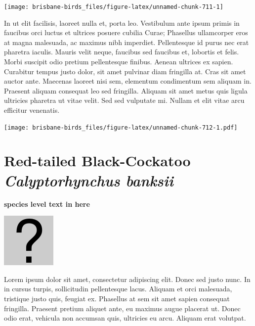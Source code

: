 \documentclass[]{book}
\let\origfigure\figure
\let\endorigfigure\endfigure
\renewenvironment{figure}[1][2] {
  \expandafter\origfigure\expandafter[H]
} {
  \endorigfigure
}
\begin{document}
\begin{figure}
\texttt{[image: brisbane-birds\_files/figure-latex/unnamed-chunk-711-1]} \caption{insert figure caption}\label{fig:unnamed-chunk-711}
\end{figure}

In ut elit facilisis, laoreet nulla et, porta leo. Vestibulum ante ipsum
primis in faucibus orci luctus et ultrices posuere cubilia Curae;
Phasellus ullamcorper eros at magna malesuada, ac maximus nibh
imperdiet. Pellentesque id purus nec erat pharetra iaculis. Mauris velit
neque, faucibus sed faucibus et, lobortis et felis. Morbi suscipit odio
pretium pellentesque finibus. Aenean ultrices ex sapien. Curabitur
tempus justo dolor, sit amet pulvinar diam fringilla at. Cras sit amet
auctor ante. Maecenas laoreet nisi sem, elementum condimentum sem
aliquam in. Praesent aliquam consequat leo sed fringilla. Aliquam sit
amet metus quis ligula ultricies pharetra ut vitae velit. Sed sed
vulputate mi. Nullam et elit vitae arcu efficitur venenatis.

\begin{figure}
\centering
\texttt{[image: brisbane-birds\_files/figure-latex/unnamed-chunk-712-1.pdf]}
\caption{\label{fig:unnamed-chunk-712}insert figure caption}
\end{figure}

\section{\texorpdfstring{Red-tailed Black-Cockatoo \emph{Calyptorhynchus
banksii}}{Red-tailed Black-Cockatoo Calyptorhynchus banksii}}\label{red-tailed-black-cockatoo-calyptorhynchus-banksii}

\textbf{species level text in here}

\begin{figure}
\centering
\includegraphics{assets/missing.png}
\caption{No image for species}
\end{figure}

Lorem ipsum dolor sit amet, consectetur adipiscing elit. Donec sed justo
nunc. In in cursus turpis, sollicitudin pellentesque lacus. Aliquam et
orci malesuada, tristique justo quis, feugiat ex. Phasellus at sem sit
amet sapien consequat fringilla. Praesent pretium aliquet ante, eu
maximus augue placerat ut. Donec odio erat, vehicula non accumsan quis,
ultricies eu arcu. Aliquam erat volutpat.
\end{document}
